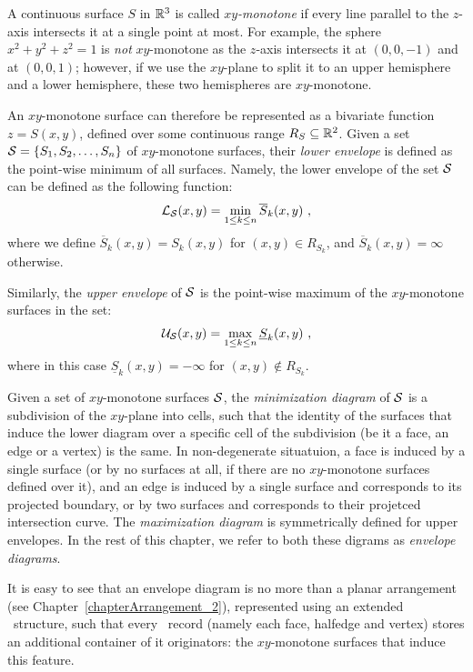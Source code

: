 
A continuous surface $S$ in $\mathbb{R}^3$ is called {\em $xy$-monotone} if
every line parallel to the $z$-axis intersects it at a single point
at most. For example, the sphere $x^2 + y^2 + z^2 = 1$ is {\em not}
$xy$-monotone as the $z$-axis intersects it at $(0, 0, -1)$ and at
$(0, 0, 1)$; however, if we use the $xy$-plane to split it to an
upper hemisphere and a lower hemisphere, these two hemispheres are
$xy$-monotone.

An $xy$-monotone surface can therefore be represented as a
bivariate function $z = S(x,y)$, defined over some continuous range
$R_S \subseteq \mathbb{R}^2$. Given a set ${\cal S} = \{ S_1, S_2, \ldots,
S_n \}$ of $xy$-monotone surfaces, their {\em lower envelope} is defined
as the point-wise minimum of all surfaces. Namely, the lower envelope
of the set ${\cal S}$ can be defined as the following function:
\begin{eqnarray*}
{\cal L}_{{\cal S}} (x,y) = \min_{1 \leq k \leq n}{\overline{S}_k (x,y)} \ ,
\end{eqnarray*}
where we define $\overline{S}_k(x,y) = S_k(x,y)$ for $(x,y) \in
R_{S_k}$, and $\overline{S}_k(x,y) = \infty$ otherwise.

Similarly, the {\em upper envelope} of ${\cal S}$ is the point-wise maximum of
the $xy$-monotone surfaces in the set:
\begin{eqnarray*}
{\cal U}_{{\cal S}} (x,y) = \max_{1 \leq k \leq n}{\underline{S}_k (x,y)} \ ,
\end{eqnarray*}
where in this case $\underline{S}_k(x,y) = -\infty$ for $(x,y) \nin
R_{S_k}$.

Given a set of $xy$-monotone surfaces ${\cal S}$, the {\em minimization
diagram} of ${\cal S}$ is a subdivision of the $xy$-plane into cells,
such that the identity of the surfaces that induce the lower diagram
over a specific cell of the subdivision (be it a face, an edge or
a vertex) is the same. In non-degenerate situatuion, a face is
induced by a single surface (or by no surfaces at all, if there are
no $xy$-monotone surfaces defined over it), and an edge is induced
by a single surface and corresponds to its projected boundary, or by
two surfaces and corresponds to their projetced intersection curve.
The {\em maximization diagram} is symmetrically defined for upper envelopes.
In the rest of this chapter, we refer to both these digrams as
{\em envelope diagrams}.

It is easy to see that an envelope diagram is no more than a planar
arrangement (see Chapter~\ref{chapterArrangement_2}), represented
using an extended \dcel\ structure, such that every \dcel\ record
(namely each face, halfedge and vertex) stores an additional container
of it originators: the $xy$-monotone surfaces that induce this feature.

